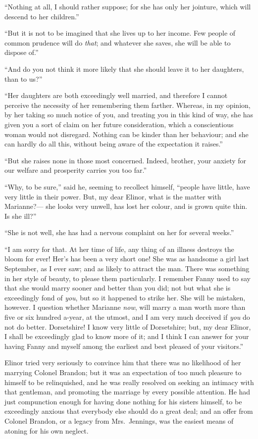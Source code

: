 \documentclass{article}
\begin{document}
``Nothing at all, I should rather suppose; for she has
only her jointure, which will descend to her children.''

``But it is not to be imagined that she lives up to
her income.  Few people of common prudence will do \emph{that};
and whatever she saves, she will be able to dispose of.''

``And do you not think it more likely that she
should leave it to her daughters, than to us?''

``Her daughters are both exceedingly well married,
and therefore I cannot perceive the necessity of her
remembering them farther.  Whereas, in my opinion, by her
taking so much notice of you, and treating you in this
kind of way, she has given you a sort of claim on her
future consideration, which a conscientious woman would
not disregard.  Nothing can be kinder than her behaviour;
and she can hardly do all this, without being aware
of the expectation it raises.''

``But she raises none in those most concerned.
Indeed, brother, your anxiety for our welfare and prosperity
carries you too far.''

``Why, to be sure,'' said he, seeming to recollect himself,
``people have little, have very little in their power.
But, my dear Elinor, what is the matter with Marianne?---%
she looks very unwell, has lost her colour, and is grown
quite thin.  Is she ill?''

``She is not well, she has had a nervous complaint
on her for several weeks.''

``I am sorry for that.  At her time of life,
any thing of an illness destroys the bloom for ever!
Her's has been a very short one!  She was as handsome a girl
last September, as I ever saw; and as likely to attract
the man.  There was something in her style of beauty,
to please them particularly.  I remember Fanny used to say
that she would marry sooner and better than you did;
not but what she is exceedingly fond of \emph{you}, but so it
happened to strike her.  She will be mistaken, however.
I question whether Marianne \emph{now}, will marry a man worth
more than five or six hundred a-year, at the utmost,
and I am very much deceived if \emph{you} do not do better.
Dorsetshire!  I know very little of Dorsetshire; but, my dear
Elinor, I shall be exceedingly glad to know more of it;
and I think I can answer for your having Fanny and myself
among the earliest and best pleased of your visitors.''

Elinor tried very seriously to convince him that
there was no likelihood of her marrying Colonel Brandon;
but it was an expectation of too much pleasure to himself
to be relinquished, and he was really resolved on seeking
an intimacy with that gentleman, and promoting the marriage
by every possible attention.  He had just compunction
enough for having done nothing for his sisters himself,
to be exceedingly anxious that everybody else should
do a great deal; and an offer from Colonel Brandon,
or a legacy from Mrs.\ Jennings, was the easiest means
of atoning for his own neglect.
\end{document}
